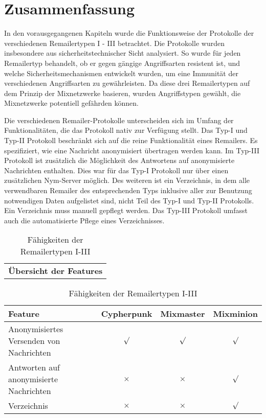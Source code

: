 \chapter{Zusammenfassung}

In den vorausgegangenen Kapiteln wurde die Funktionsweise der Protokolle der verschiedenen Remailertypen I - III betrachtet. Die Protokolle wurden insbesondere aus sicherheitstechnischer Sicht analysiert. So wurde für jeden Remailertyp behandelt, ob er gegen gängige Angriffsarten resistent ist, und welche Sicherheitsmechanismen entwickelt wurden, um eine Immunität der verschiedenen Angriffsarten zu gewährleisten.  Da diese drei Remailertypen auf dem Prinzip der Mixnetzwerke basieren, wurden Angriffstypen gewählt, die Mixnetzwerke potentiell gefährden können.

Die verschiedenen Remailer-Protokolle unterscheiden sich im Umfang der Funktionalitäten, die das Protokoll nativ zur Verfügung stellt. Das Typ-I und Typ-II Protokoll beschränkt sich auf die reine Funktionalität eines Remailers. Es spezifiziert, wie eine Nachricht anonymisiert übertragen werden kann. Im Typ-III Protokoll ist zusätzlich die Möglichkeit des Antwortens auf anonymisierte Nachrichten enthalten. Dies war für das Typ-I Protokoll nur über einen zusätzlichen Nym-Server möglich. Des weiteren ist ein Verzeichnis, in dem alle verwendbaren Remailer des entsprechenden Typs inklusive aller zur Benutzung notwendigen Daten aufgelistet sind, nicht Teil des Typ-I und Typ-II Protokolls. Ein Verzeichnis muss manuell gepflegt werden. Das Typ-III Protokoll umfasst auch die automatisierte Pflege eines Verzeichnisses.

\begin{table}[htbp]
	\centering
	\begin{tabular}{c}
		\textbf{Übersicht der Features}
	\end{tabular}
		
	\begin{tabular}{m{7.5cm} || c | c | c}
		\hline
		\textbf{Feature} & \textbf{Cypherpunk} & \textbf{Mixmaster} & \textbf{Mixminion} \\
		\hline
		Anonymisiertes Versenden von Nachrichten & $\surd$ & $\surd$ & $\surd$ \\
		Antworten auf anonymisierte Nachrichten & $\times$ & $\times$ & $\surd$ \\
		Verzeichnis & $\times$ & $\times$ & $\surd$ \\
	\end{tabular}

	\caption{Fähigkeiten der Remailertypen I-III}
\end{table}


